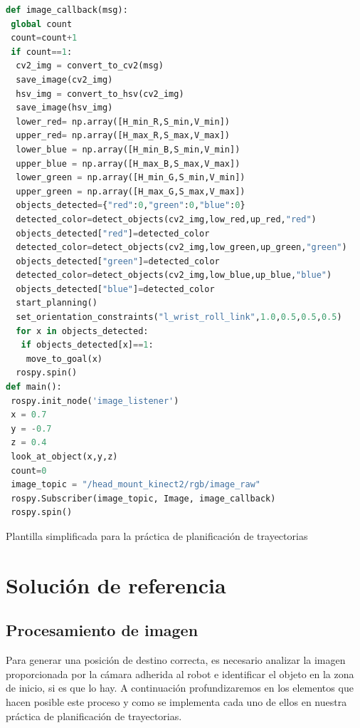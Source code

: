 \documentclass[12pt,spanish,chapterprefix, numbers=noenddot]{book}
\numberwithin{equation}{section}
\numberwithin{figure}{section}
\begin{document}
\vspace{20pt}
\begin{algorithm}[htb!]
	\begin{lstlisting}[breaklines=true,language=python]    
def image_callback(msg):
 global count
 count=count+1
 if count==1:
  cv2_img = convert_to_cv2(msg)
  save_image(cv2_img)
  hsv_img = convert_to_hsv(cv2_img)
  save_image(hsv_img)
  lower_red= np.array([H_min_R,S_min,V_min])
  upper_red= np.array([H_max_R,S_max,V_max])
  lower_blue = np.array([H_min_B,S_min,V_min])
  upper_blue = np.array([H_max_B,S_max,V_max])
  lower_green = np.array([H_min_G,S_min,V_min])
  upper_green = np.array([H_max_G,S_max,V_max])
  objects_detected={"red":0,"green":0,"blue":0}
  detected_color=detect_objects(cv2_img,low_red,up_red,"red")
  objects_detected["red"]=detected_color
  detected_color=detect_objects(cv2_img,low_green,up_green,"green")
  objects_detected["green"]=detected_color
  detected_color=detect_objects(cv2_img,low_blue,up_blue,"blue")
  objects_detected["blue"]=detected_color
  start_planning()
  set_orientation_constraints("l_wrist_roll_link",1.0,0.5,0.5,0.5)
  for x in objects_detected:
   if objects_detected[x]==1:
    move_to_goal(x)
  rospy.spin()
def main():
 rospy.init_node('image_listener')
 x = 0.7
 y = -0.7
 z = 0.4
 look_at_object(x,y,z)
 count=0
 image_topic = "/head_mount_kinect2/rgb/image_raw"
 rospy.Subscriber(image_topic, Image, image_callback)
 rospy.spin()
	\end{lstlisting}
\caption{\label{alg:template-py}Plantilla simplificada para la práctica de planificación de trayectorias}
\end{algorithm}

\chapter{Solución de referencia}
\section{Procesamiento de imagen}
Para generar una posición de destino correcta, es necesario analizar la imagen proporcionada por la cámara adherida al robot  e identificar el objeto en la zona de inicio, si es que lo hay. 
A continuación profundizaremos en los elementos que hacen posible este proceso y como se implementa cada uno de ellos en nuestra práctica de planificación de trayectorias. 
\end{document}
